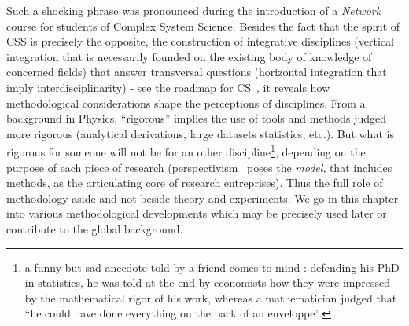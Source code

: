 Such a shocking phrase 
was pronounced during the introduction of a \emph{Network} course for students of Complex System Science. Besides the fact that the spirit of CSS 
 is precisely the opposite, {\ie} the construction of integrative disciplines (vertical integration that is necessarily founded on the existing body of knowledge of concerned fields) that answer transversal questions (horizontal integration that imply interdisciplinarity) - see {\eg} the roadmap for CS~\cite{2009arXiv0907.2221B}, it reveals how methodological considerations shape the perceptions of disciplines. From a background in Physics, 
 ``rigorous'' implies the use of tools and methods judged more rigorous (analytical derivations, large datasets statistics, etc.).
  But what is rigorous for someone will not be for an other discipline\footnote{a funny but sad anecdote told by a friend comes to mind : defending his PhD in statistics, he was told at the end by economists how they were impressed by the mathematical rigor of his work, whereas a mathematician judged that ``he could have done everything on the back of an enveloppe''.}, depending on the purpose of each piece of research (perspectivism~\cite{giere2010scientific} poses the \emph{model}, that includes methods, as the articulating core of research entreprises). Thus the full role of methodology aside and not beside theory and experiments. We go in this chapter into various methodological developments which may be precisely used later or contribute to the global background.






